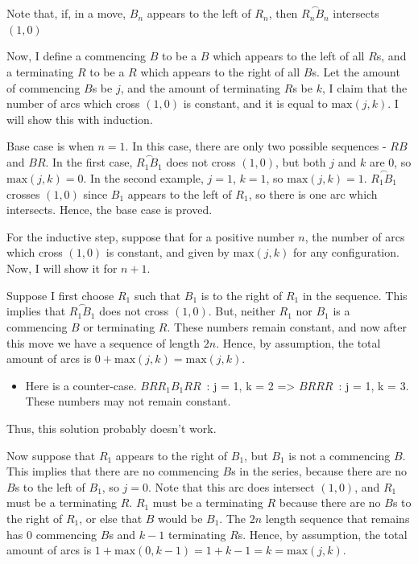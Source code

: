 \begin{enumerate}
 Note that, if, in a move, $B_n$ appears to the left of $R_n$, then $\stackrel{\frown}{R_nB_n}$ intersects $(1,0)$

 Now, I define a commencing $B$ to be a $B$ which appears to the left of all $R$s, and a terminating $R$ to be a $R$ which appears to the right of all $B$s. Let the amount of commencing $B$s be $j$, and the amount of terminating $R$s be $k$, I claim that the number of arcs which cross $(1,0)$ is constant, and it is equal to $\text{max}(j,k)$. I will show this with induction.

 Base case is when $n=1$. In this case, there are only two possible sequences - $RB$ and $BR$. In the first case, $\stackrel{\frown}{R_1B_1}$ does not cross $(1, 0)$, but both $j$ and $k$ are $0$, so $\text{max}(j,k)=0$. In the second example, $j=1$, $k=1$, so $\text{max}(j,k)=1$. $\stackrel{\frown}{R_1B_1}$ crosses $(1,0)$ since $B_1$ appears to the left of $R_1$, so there is one arc which intersects. Hence, the base case is proved.

 For the inductive step, suppose that for a positive number $n$, the number of arcs which cross $(1,0)$ is constant, and given by $\text{max}(j, k)$ for any configuration. Now, I will show it for $n+1$.

 Suppose I first choose $R_1$ such that $B_1$ is to the right of $R_1$ in the sequence. This implies that $\stackrel{\frown}{R_1B_1}$ does not cross $(1,0)$. But, neither $R_1$ nor $B_1$ is a commencing $B$ or terminating $R$. These numbers remain constant, and now after this move we have a sequence of length $2n$. Hence, by assumption, the total amount of arcs is $0+\text{max}(j,k)=\text{max}(j,k)$.

 
            \begin{itemize}
        \item Here is a counter-case. $BRR_{1}B_{1}RR$ : j = 1, k = 2 => $BRRR$ : j = 1, k = 3. These numbers may not remain constant.
            \end{itemize}
            Thus, this solution probably doesn't work.

 Now suppose that $R_1$ appears to the right of $B_1$, but $B_1$ is not a commencing $B$. This implies that there are no commencing $B$s in the series, because there are no $B$s to the left of $B_1$, so $j=0$. Note that this arc does intersect $(1,0)$, and $R_1$ must be a terminating $R$. $R_1$ must be a terminating $R$ because there are no $B$s to the right of $R_1$, or else that $B$ would be $B_1$. The $2n$ length sequence that remains has $0$ commencing $B$s and $k-1$ terminating $R$s. Hence, by assumption, the total amount of arcs is $1+\text{max}(0,k-1)=1+k-1=k=\text{max}(j,k)$.


\end{enumerate}
